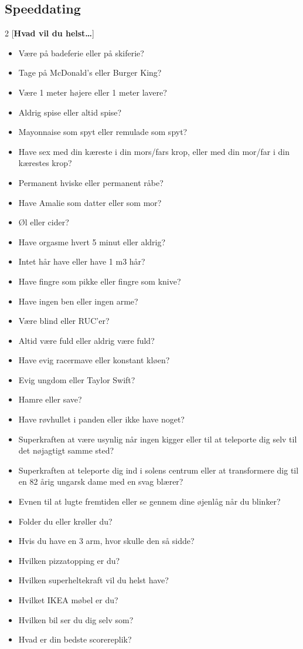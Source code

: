 \subsection{Speeddating}
\begin{multicols}{2}
[\textbf{Hvad vil du helst\ldots}]
\begin{itemize}
  \item Være på badeferie eller på skiferie?
  \item Tage på McDonald’s eller Burger King?
  \item Være 1 meter højere eller 1 meter lavere?
  \item Aldrig spise eller altid spise?
  \item Mayonnaise som spyt eller remulade som spyt?
  \item Have sex med din kæreste i din mors/fars krop, eller med din mor/far i din kærestes krop?
  \item Permanent hviske eller permanent råbe?
  \item Have Amalie som datter eller som mor?
  \item Øl eller cider?
  \item Have orgasme hvert 5 minut eller aldrig?
  \item Intet hår have eller have 1 m3 hår?
  \item Have fingre som pikke eller fingre som knive?
  \item Have ingen ben eller ingen arme?
  \item Være blind eller RUC’er?
  \item Altid være fuld eller aldrig være fuld?
  \item Have evig racermave eller konstant kløen?
  \item Evig ungdom eller Taylor Swift?
  \item Hamre eller save?
  \item Have røvhullet i panden eller ikke have noget?
  \item Superkraften at være usynlig når ingen kigger eller til at teleporte dig selv til det nøjagtigt samme sted?
  \item Superkraften at teleporte dig ind i solens centrum eller at transformere dig til en 82 årig ungarsk dame med en svag blærer?
  \item Evnen til at lugte fremtiden eller se gennem dine øjenlåg når du blinker?
  \item Folder du eller krøller du?
  \item Hvis du have en 3 arm, hvor skulle den så sidde?
  \item Hvilken pizzatopping er du?
  \item Hvilken superheltekraft vil du helst have?
  \item Hvilket IKEA møbel er du?
  \item Hvilken bil ser du dig selv som?
  \item Hvad er din bedste scorereplik?
\end{itemize}

\end{multicols}